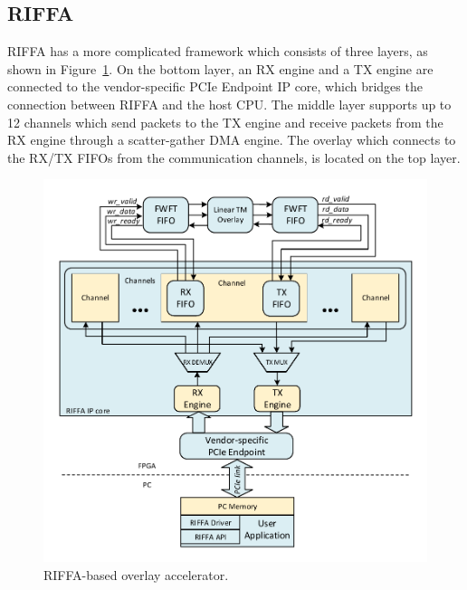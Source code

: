 \subsection{RIFFA}
RIFFA has a more complicated framework which consists of three layers, as shown in Figure~\ref{riffa}. 
On the bottom layer, an RX engine and a TX engine are connected to the vendor-specific PCIe Endpoint IP core, which bridges the connection between RIFFA and the host CPU. 
The middle layer supports up to 12 channels which send packets to the TX engine and receive packets from the RX engine through a scatter-gather DMA engine. 
The overlay which connects to the RX/TX FIFOs from the communication channels, is located on the top layer. 

\begin{figure}[tb]
	\centering
	\includegraphics[width=0.9\columnwidth]{Figures/riffa.pdf}
	\caption{RIFFA-based overlay accelerator.}
	\label{riffa}
\end{figure}

